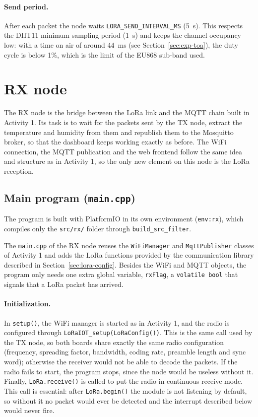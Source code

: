 \documentclass[informe,english]{plantilla}
\begin{document}
\paragraph{Send period.} After each packet the node waits \texttt{LORA\_SEND\_INTERVAL\_MS} (5~s). This respects the DHT11 minimum
sampling period (1~s) and keeps the channel occupancy low: with a time on air of around 44~ms (see Section~\ref{sec:exp-toa}), the duty cycle is below 1\%, which is the limit of the EU868 sub-band used.

\section{RX node}
\label{sec:rx}

The RX node is the bridge between the LoRa link and the MQTT chain built in Activity 1. Its task is to wait for the packets sent by the TX node, extract the temperature and humidity from them and republish them to the Mosquitto broker, so that the dashboard keeps working exactly as before. The WiFi connection, the MQTT publication and the web frontend follow the same idea and structure as in Activity 1, so the only new element on this node is the LoRa reception.

\subsection{Main program (\texttt{main.cpp})}

The program is built with PlatformIO in its own environment (\texttt{env:rx}), which compiles only the \texttt{src/rx/} folder through \texttt{build\_src\_filter}.

The \texttt{main.cpp} of the RX node reuses the \texttt{WiFiManager} and \texttt{MqttPublisher} classes of Activity 1 and adds the LoRa functions provided by the communication library described in Section~\ref{sec:lora-config}. Besides the WiFi and MQTT objects, the program only needs one extra global variable, \texttt{rxFlag}, a \texttt{volatile bool} that signals that a LoRa packet has arrived.

\paragraph{Initialization.} In \texttt{setup()}, the WiFi manager is started as in Activity 1, and the radio is configured through \texttt{LoRaIOT\_setup(LoRaConfig())}. This is the same call used by the TX node, so both boards share exactly the same radio configuration (frequency, spreading factor, bandwidth, coding rate, preamble length and sync word); otherwise the receiver would not be able to decode the packets. If the radio fails to start, the program stops, since the node would be useless without it. Finally, \texttt{LoRa.receive()} is called to put the radio in continuous receive mode. This call is essential: after \texttt{LoRa.begin()} the module is not listening by default, so without it no packet would ever be detected and the interrupt described below would never fire.
\end{document}
